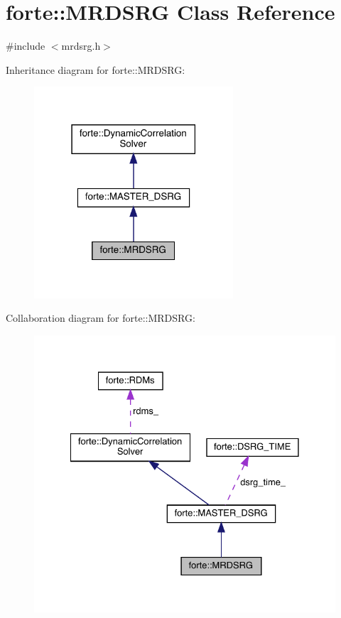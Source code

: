 \hypertarget{classforte_1_1_m_r_d_s_r_g}{}\section{forte\+:\+:M\+R\+D\+S\+RG Class Reference}
\label{classforte_1_1_m_r_d_s_r_g}


{\ttfamily \#include $<$mrdsrg.\+h$>$}



Inheritance diagram for forte\+:\+:M\+R\+D\+S\+RG\+:
\nopagebreak
\begin{figure}[H]
\begin{center}
\leavevmode
\includegraphics[width=210pt]{classforte_1_1_m_r_d_s_r_g__inherit__graph}
\end{center}
\end{figure}


Collaboration diagram for forte\+:\+:M\+R\+D\+S\+RG\+:
\nopagebreak
\begin{figure}[H]
\begin{center}
\leavevmode
\includegraphics[width=328pt]{classforte_1_1_m_r_d_s_r_g__coll__graph}
\end{center}
\end{figure}
